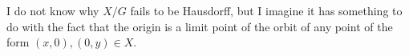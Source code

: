 \begin{homework}[e]
\begin{prf}
\begin{enumerate}[(a)]
    I do not know why $X/G$ fails to be Hausdorff, but I imagine it has something to do with the fact that the origin is a limit point of the orbit of any point of the form $(x,0),(0,y) \in X$.
\end{enumerate}
\end{prf}

\end{homework}


